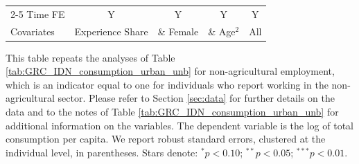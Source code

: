 \begin{table}[htbp]
\begin{threeparttable}
\begin{tabular}{l cccc}
\cmidrule{2-5} Time FE & Y & Y & Y & Y \\ Covariates & Experience Share & \& Female & \& Age$^2$ & All \\ \bottomrule \end{tabular} \begin{tablenotes}[flushleft] \footnotesize \item{This table repeats the analyses of Table \ref{tab:GRC_IDN_consumption_urban_unb}  for non-agricultural employment, which is an indicator equal to one for individuals who report working in the non-agricultural sector. Please refer to Section \ref{sec:data} for further details on the data and to the notes of Table \ref{tab:GRC_IDN_consumption_urban_unb} for additional information on the variables. The dependent variable is the log of total consumption per capita. We report robust standard errors, clustered at the individual level, in parentheses. Stars denote: $^{*} p<0.10$; $^{**} p<0.05$; $^{***} p<0.01$.} \end{tablenotes} \end{threeparttable} \end{table}

